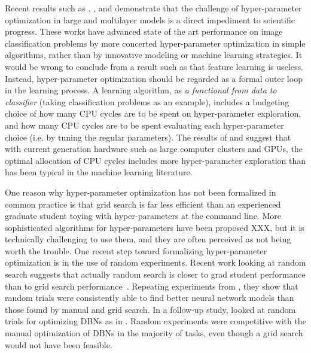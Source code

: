 \documentclass{article}
\renewcommand{\citet}{\cite}
\begin{document}
Recent results such as 
\citet{Pinto-2009}, \citet{coates+lee+ng:2010}, and \citet{coates+ng:2011}
demonstrate that the challenge of hyper-parameter optimization
in large and multilayer models is a direct impediment to scientific progress.
These works
have advanced state of the art performance on image classification problems
by more concerted hyper-parameter optimization in simple algorithms,
rather than by innovative modeling or machine learning strategies.
It would be wrong to conclude from a result such as \citet{Pinto-2009}
that feature learning is useless.
Instead, hyper-parameter optimization should be regarded as
a formal outer loop in the learning process.
A learning algorithm,
as {\em a functional from data to classifier} (taking classification problems as an example),
includes a budgeting choice of how many CPU cycles are to be spent on hyper-parameter exploration,
and how many CPU cycles are to be spent evaluating each hyper-parameter choice (i.e. by
tuning the regular parameters).
The results of \citet{Pinto-2009} and \citet{coates+ng:2011} suggest that
with current generation hardware such as large computer clusters and GPUs,
the optimal allocation of CPU cycles includes more hyper-parameter exploration
than has been typical in the machine learning literature.

One reason why hyper-parameter optimization has not been formalized in common
practice is that grid search is far less efficient than an experienced graduate
student toying with hyper-parameters at the command line.
More sophisticated algorithms for hyper-parameters have been proposed
XXX,
but it is technically challenging to use them, and they are often perceived as not being worth the trouble.
One recent step toward formalizing hyper-parameter optimization is in the use of random experiments.
Recent work looking at random search suggests that actually random search is closer
to grad student performance than to grid search performance~\citet{Bergstra+Bengio:2011snowbird}.
Repeating experiments from \citet{Larochelle+etal:2007}, they show that
random trials were consistently able to find better neural network models than those found by
manual and grid search.
In a follow-up study, \citet{bergstra+bengio:2011jmlrANON} looked at random trials
for optimizing DBNs as in \citet{Larochelle+etal:2007}.
Random experiments were competitive with the manual optimization of DBNs in the majority of tasks,
even though a grid search would not have been feasible.
\end{document}
